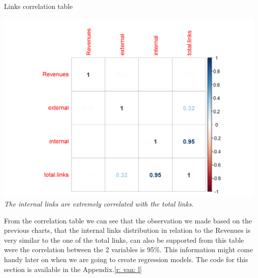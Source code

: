\documentclass{article}
\begin{document}
\begin{table}[H]
\centering
\caption{Links correlation table}
\begin{center}
\includegraphics[scale=0.5]{../R/photos/29_rev_cor_links.png}  \\
\textit{The internal links are extremely correlated with the total links.}
\end{center}
\end{table}
From the correlation table we can see that the observation we made based on the previous charts, that the internal links distribution in relation to the Revenues is very similar to the one of the total links, can also be supported from this table were the correlation between the 2 variables is 95\%. This information might come handy later on when we are going to create regression models. The code for this section is available in the Appendix.\ref{r: van: l}
\end{document}

